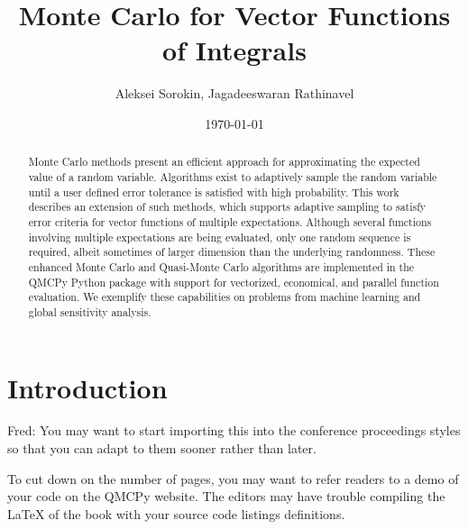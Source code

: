 \documentclass{article}[12pt]
\title{Monte Carlo for Vector Functions of Integrals}
\author{Aleksei Sorokin, Jagadeeswaran Rathinavel}
\date{\today}
\newcommand{\FJHComment}[1]{{\color{purple}Fred:  #1}}
\begin{document}
\maketitle

\begin{abstract}
Monte Carlo methods present an efficient approach for approximating the expected value of a random variable. Algorithms exist to adaptively sample the random variable until a user defined error tolerance is satisfied with high probability. This work describes an extension of such methods, which supports adaptive sampling to satisfy error criteria for vector functions of multiple expectations. Although several functions involving multiple expectations are being evaluated, only one random sequence is required, albeit sometimes of larger dimension than the underlying randomness. These enhanced Monte Carlo and Quasi-Monte Carlo algorithms are implemented in the QMCPy Python package with support for vectorized, economical, and parallel function evaluation. We exemplify these capabilities on problems from machine learning and global sensitivity analysis.
\end{abstract}

\tableofcontents

\newpage

\section{Introduction}

\FJHComment{You may want to start importing this into the conference proceedings styles so that you can adapt to them sooner rather than later.

To cut down on the number of pages, you may want to refer readers to a demo of your code on the QMCPy website.  The editors may have trouble compiling the LaTeX of the book with your source code listings definitions.

}
\end{document}
